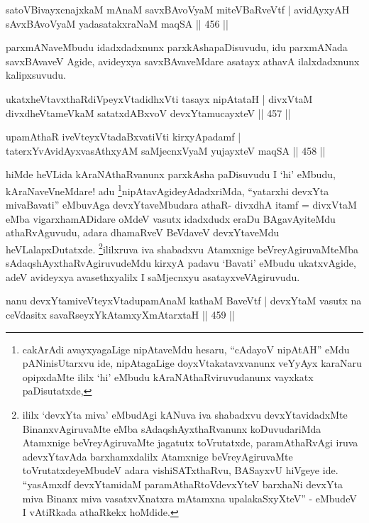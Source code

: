 \begin{shl}
satoV\s BivayxcnajxkaM mAnaM savxBAvoV\s yaM miteVBaRveVtf |
avidAyxyAH sAvxBAvoV\s yaM yadasatakxraNaM maqSA \hfill || 456 ||
\end{shl}

\begin{artha}
parxmANaveMbudu idadxdadxnunx parxkAshapaDisuvudu, idu parxmANada savxBAvaveV Agide, avideyxya savxBAvaveMdare asatayx athavA ilalxdadxnunx kalipxsuvudu.
\end{artha}

\begin{shl}
ukatxheVtavxthaRdiVpeyxVtadidhxVti tasayx nipAtataH |
divxVtaM divxdheVtameVkaM satatxdABxvoV devxYtamucayxteV \hfill || 457 ||
\end{shl}
\begin{shl}
upamAthaR iveVteyxVtadaBxvatiVti kirxyApadamf |
taterxYvAvidAyxvasAthxyAM saMjecnxVyaM yujayxteV maqSA \hfill || 458 ||
\end{shl}

\begin{artha}
hiMde heVLida kAraNAthaRvanunx parxkAsha paDisuvudu I `hi' eMbudu,
kAraNaveVneMdare! adu \footnote{cakArAdi avayxyagaLige nipAtaveMdu
 hesaru, ``cAdayoV nipAtAH'' eMdu pANinisUtarxvu ide, nipAtagaLige
 doyxVtakatavxvanunx veYyAyx karaNaru opipxdaMte ililx `hi' eMbudu
 kAraNAthaR\break viruvudanunx vayxkatx paDisutatxde,}nipAtavAgideyAdadxriMda,
``yatarxhi devxYta mivaBavati'' eMbuvAga devxYtaveMbudara athaR-
divxdhA itamf = divxVtaM eMba vigarxhamADidare oMdeV vasutx idadxdudx
eraDu BAgavAyiteMdu athaRvAguvudu, adara dhamaRveV BeVdaveV
devxYtaveMdu heVLalapxDutatxde. \footnote{ililx `devxYta miva'
eMbudAgi kANuva iva shabadxvu devxYtavidadxMte BinanxvAgiruvaMte eMba
sAdaqshAyxthaRvanunx koDuvudariMda Atamxnige beVreyAgiruvaMte jagatutx
toVrutatxde, paramAthaRvAgi iruva adevxYtavAda barxhamxdalilx
Atamxnige beVreyAgiruvaMte toVrutatxdeyeMbudeV adara vishiSATxthaRvu,
BASayxvU hiVgeye ide. ``yasAmxdf devxYtamidaM paramAthaRtoV\s devxYteV
barxhaNi devxYta miva Binanx miva vasatxvXnatxra mAtamxna
upalakaSxyXteV'' - eMbudeV I vAtiRkada athaRkekx hoMdide.}ililxruva iva shabadxvu
Atamxnige beVreyAgiruvaMteMba sAdaqshAyxthaRvAgiruvudeMdu kirxyA
padavu `Bavati' eMbudu ukatxvAgide, adeV avideyxya avasethxyalilx I
saMjecnxyu asatayxveV\break Agiruvudu.
\end{artha}

\begin{shl}
nanu devxYtamiveVteyxVtadupamAnaM kathaM BaveVtf |
devxYtaM vasutx na ceVdasitx savaRseyxYkAtamxyXmAtarxtaH \hfill || 459 ||
\end{shl}

